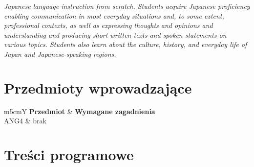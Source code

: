 \documentclass[12pt, a4paper]{article}
\newcommand{\thdrule}{\noalign{\global\setlength{\extrarowheight}{0pt}}}
\newcommand{\thdend}{\noalign{\global\setlength{\extrarowheight}{3pt}}}
\begin{document}
\textit{Japanese language instruction from scratch. Students acquire Japanese proficiency enabling communication in most everyday situations and, to some extent, professional contexts, as well as expressing thoughts and opinions and understanding and producing short written texts and spoken statements on various topics. Students also learn about the culture, history, and everyday life of Japan and Japanese-speaking regions.}


\section{Przedmioty wprowadzające}

{\scriptsize
\begin{tabularx}{\textwidth}{m{5cm}Y}
\thdrule\toprule
{} {\color{white}\textbf{Przedmiot}} & {\color{white}\textbf{Wymagane zagadnienia}} \\
\midrule\thdend
   ANG4 & brak \\
\bottomrule
\end{tabularx}}

\section{Treści programowe}
\end{document}
